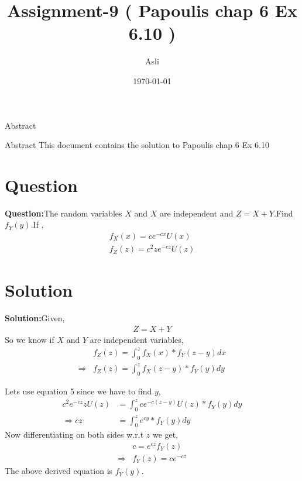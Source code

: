\documentclass{beamer}
\title{ Assignment-9 ( Papoulis chap 6 Ex 6.10 )}
\author{Asli}
\institute{IIT Hyderabad}
\date{\today }
\begin{document}
\begin{frame}
      \titlepage
\end{frame}



\begin{frame}{Abstract}
     \begin{block}{Abstract}
          This document contains the solution to Papoulis chap 6 Ex 6.10
      \end{block}
\end{frame}

 \section{Question}
    
     \begin{frame}
         \textbf{Question:}The random variables $X$ and $X$ are independent and $Z = X + Y$.Find $f_{Y}(y)$.If ,
     \begin{align}
         f_{X}(x)=ce^{-cx}U(x)\\
         f_{Z}(z)=c^{2}ze^{-cz}U(z)
     \end{align}
     \end{frame}
     \section{Solution}
     \begin{frame}
     \textbf{Solution:}Given,
     \begin{align}
     Z=X+Y    
     \end{align}
     So we know if $X$ and $Y$ are independent variables,
     \begin{align}
       &f_{Z}(z)=\int_{0}^{z}f_{X}(x)*f_{Y}(z-y) dx\\
       \Rightarrow&  f_{Z}(z)= \int_{0}^{z}f_{X}(z-y)*  f_{Y}(y) dy
     \end{align}
     \end{frame}
     \begin{frame}
     Lets use equation 5 since we have to find $y$,
     \begin{align}
         c^{2}e^{-cz}zU(z)&= \int_{0}^{z}ce^{-c(z-y)}U(z)*f_{Y}(y) dy\\
         \Rightarrow cz&=\int_{0}^{z}e^{cy}*f_{Y}(y) dy
     \end{align}
          Now differentiating on both sides  w.r.t $z$ we get,
\begin{align}
    &c=e^{cz}f_{Y}(z)\\
    \Rightarrow&f_{Y}(z)=ce^{-cz}
\end{align}
The above derived equation is $f_{Y}(y)$.
     \end{frame}


         
\end{document}
